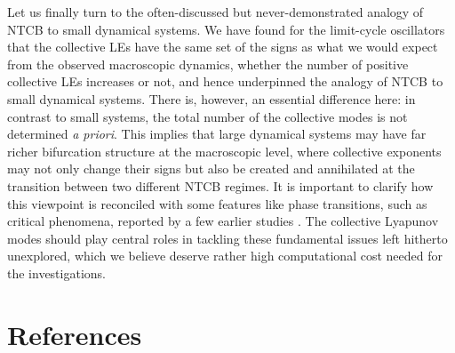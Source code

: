 \documentclass[12pt]{iopart}
\begin{document}
Let us finally turn to the often-discussed but never-demonstrated analogy
 of NTCB to small dynamical systems.
We have found for the limit-cycle oscillators that the collective LEs
 have the same set of the signs as what we would expect
 from the observed macroscopic dynamics,
 whether the number of positive collective LEs increases or not,
 and hence underpinned the analogy of NTCB to small dynamical systems.
There is, however, an essential difference here:
 in contrast to small systems,
 the total number of the collective modes is not determined \textit{a priori}.
This implies that large dynamical systems may have far richer
 bifurcation structure at the macroscopic level,
 where collective exponents may not only change their signs
 but also be created and annihilated
 at the transition between two different NTCB regimes.
It is important to clarify how this viewpoint is reconciled
 with some features like phase transitions, such as critical phenomena,
 reported by a few earlier studies
 \cite{Lemaitre.Chate-PRL1999,Marcq.etal-PTPS2006}.
The collective Lyapunov modes should play central roles
 in tackling these fundamental issues left hitherto unexplored,
 which we believe deserve rather high computational cost
 needed for the investigations.

\section*{References}

%

    

%     
\end{document}
